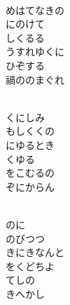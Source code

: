 \documentclass[10pt,b5j]{tarticle} %
\begin{document}
\begin{enumerate}
\begin{minipage}[c]{\blocksize}
    \end{minipage}
    \begin{minipage}[c]{\blocksize}
        
        \vspace{\linespace}
        \item~\\
        めはてなきの\\
        にのけて\\
        しくるる\\
        うすれゆくに\\
        ひぞする\\
        禍ののまぐれ
        
    \end{minipage}
    \begin{minipage}[c]{\blocksize}
        
        \vspace{\linespace}
        \item~\\
        くにしみ\\
        もしくくの\\
        にゆるとき\\
        くゆる\\
        をこむるの\\
        ぞにからん
        
    \end{minipage}
    \begin{minipage}[c]{\blocksize}
        
        \vspace{\linespace}
        \item~\\
        のに\\
        のびつつ\\
        きにきなんと\\
        をくどちよ\\
        てしの\\
        きへかし
    
    \end{minipage}
\end{enumerate} %
\end{document}
